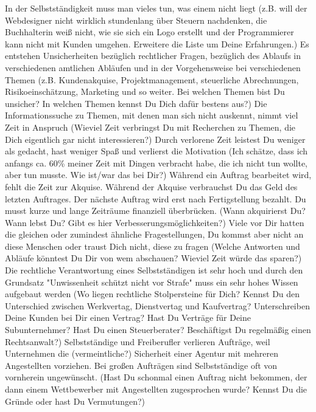 \begin{appendix}
    In der Selbstständigkeit muss man vieles tun, was einem nicht liegt (z.B. will der Webdesigner nicht wirklich stundenlang über Steuern nachdenken, die Buchhalterin weiß nicht, wie sie sich ein Logo erstellt und der Programmierer kann nicht mit Kunden umgehen. Erweitere die Liste um Deine Erfahrungen.)
    Es entstehen Unsicherheiten bezüglich rechtlicher Fragen, bezüglich des Ablaufs in verschiedenen amtlichen Abläufen und in der Vorgehensweise bei verschiedenen Themen (z.B. Kundenakquise, Projektmanagement, steuerliche Abrechnungen, Risikoeinschätzung, Marketing und so weiter. Bei welchen Themen bist Du unsicher? In welchen Themen kennst Du Dich dafür bestens aus?)
    Die Informationssuche zu Themen, mit denen man sich nicht auskennt, nimmt viel Zeit in Anspruch (Wieviel Zeit verbringst Du mit Recherchen zu Themen, die Dich eigentlich gar nicht interessieren?)
    Durch verlorene Zeit leistest Du weniger als gedacht, hast weniger Spaß und verlierst die Motivation (Ich schätze, dass ich anfangs ca. 60\% meiner Zeit mit Dingen verbracht habe, die ich nicht tun wollte, aber tun musste. Wie ist/war das bei Dir?)
    Während ein Auftrag bearbeitet wird, fehlt die Zeit zur Akquise. Während der Akquise verbrauchst Du das Geld des letzten Auftrages. Der nächste Auftrag wird erst nach Fertigstellung bezahlt. Du musst kurze und lange Zeiträume finanziell überbrücken. (Wann akquirierst Du? Wann lebst Du? Gibt es hier Verbesserungsmöglichkeiten?)
    Viele vor Dir hatten die gleichen oder zumindest ähnliche Fragestellungen, Du kommst aber nicht an diese Menschen oder traust Dich nicht, diese zu fragen (Welche Antworten und Abläufe könntest Du Dir von wem abschauen? Wieviel Zeit würde das sparen?)
    Die rechtliche Verantwortung eines Selbstständigen ist sehr hoch und durch den Grundsatz "Unwissenheit schützt nicht vor Strafe" muss ein sehr hohes Wissen aufgebaut werden (Wo liegen rechtliche Stolpersteine für Dich? Kennst Du den Unterschied zwischen Werkvertag, Dienstvertag und Kaufvertrag? Unterschreiben Deine Kunden bei Dir einen Vertrag? Hast Du Verträge für Deine Subunternehmer? Hast Du einen Steuerberater? Beschäftigst Du regelmäßig einen Rechtsanwalt?)
    Selbstständige und Freiberufler verlieren Aufträge, weil Unternehmen die (vermeintliche?) Sicherheit einer Agentur mit mehreren Angestellten vorziehen. Bei großen Aufträgen sind Selbstständige oft von vornherein ungewünscht. (Hast Du schonmal einen Auftrag nicht bekommen, der dann einem Wettbewerber mit Angestellten zugesprochen wurde? Kennst Du die Gründe oder hast Du Vermutungen?)


\end{appendix}
